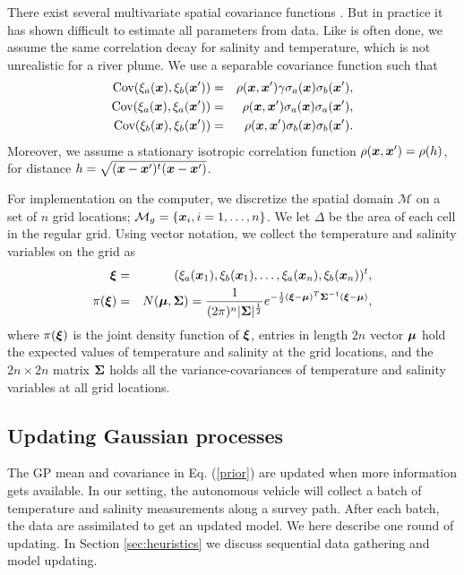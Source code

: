 \documentclass[aoas]{imsart}
\begin{document}
There exist several multivariate spatial covariance functions \citep{gneiting2010matern,genton2015cross}. But in practice it has shown difficult to estimate all parameters from data. Like is often done, we assume the same correlation decay for salinity and temperature, which is not unrealistic for a river plume. We use a separable covariance function such that
\begin{eqnarray}\label{gp_corr}
\mbox{Cov}(\xi_a(\bx),\xi_b(\bx')) &=& \rho(\bx,\bx') \gamma \sigma_a(\bx) \sigma_b(\bx'), \\
\mbox{Cov}(\xi_a(\bx),\xi_a(\bx')) &=& \rho(\bx,\bx') \sigma_a(\bx) \sigma_a(\bx'), \nonumber \\
\mbox{Cov}(\xi_b(\bx),\xi_b(\bx')) &=& \rho(\bx,\bx') \sigma_b(\bx) \sigma_b(\bx'). \nonumber
\end{eqnarray}
Moreover, we assume a stationary isotropic correlation function $\rho({\boldsymbol x},{\boldsymbol x}')=\rho(h)$, for distance $h=\sqrt{({\boldsymbol x}-{\boldsymbol x}')^t ({\boldsymbol x}-{\boldsymbol x}')}$.

For implementation on the computer, we discretize the spatial domain $\mathcal{M}$ on a set of $n$ grid locations; $\mathcal{M}_g = \{{\boldsymbol x}_i, i=1,\ldots,n \}$.
We let $\Delta$ be the area of each cell in the regular grid.
Using vector notation, we collect the temperature and salinity variables on the grid as
\begin{eqnarray}
    \bxi &=& (\xi_a(\bx_1),\xi_b(\bx_1),\ldots,\xi_a(\bx_n),\xi_b(\bx_n))^t, \nonumber \\
    \pi(\bxi) &=& N(\bmu,\bSigma) = \frac{1}{(2\pi)^{n}|\bSigma|^{\frac{1}{2}}}e^{-\frac{1}{2}(\bxi -\bmu)^T\bSigma^{-1}(\bxi - \bmu)},
\end{eqnarray}
where $\pi({\boldsymbol \xi})$ is the joint density function of ${\boldsymbol \xi}$, entries in length $2 n$ vector ${\boldsymbol \mu}$ hold the expected values of temperature and salinity at the grid locations, and the $2n \times 2n$ matrix ${\boldsymbol \Sigma}$ holds all the variance-covariances of temperature and salinity variables at all grid locations. 

\subsection{Updating Gaussian processes}

The GP mean and covariance in Eq. (\ref{prior}) are updated when more information gets available. 
In our setting, the autonomous vehicle will collect a batch of temperature and salinity measurements along a survey path. After each batch, the data are assimilated to get an updated model.
We here describe one round of updating. In Section \ref{sec:heuristics} we discuss sequential data gathering and model updating.
\end{document}
